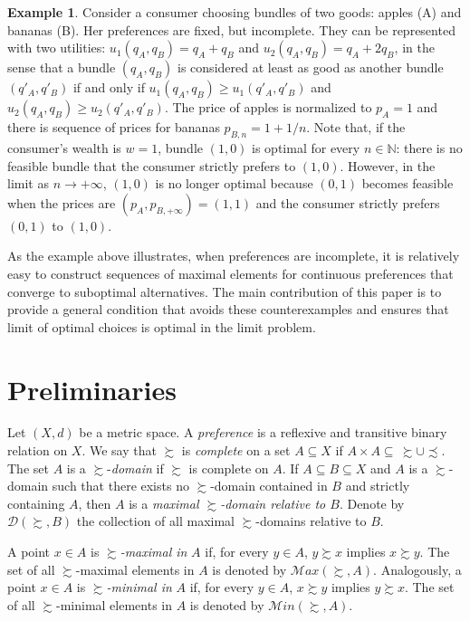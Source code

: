 \documentclass[12pt, oneside]{amsart}
\theoremstyle{definition}
\newtheorem{example}{Example}
\begin{document}
\begin{example}
Consider a consumer choosing bundles of two goods: apples (A) and bananas (B). Her preferences are fixed, but incomplete. They can be represented with two utilities: $u_1(q_A, q_B) = q_A + q_B$ and $u_2(q_A, q_B) = q_A + 2 q_B$, in the sense that a bundle $(q_A, q_B)$ is considered at least as good as another bundle $(q'_A, q'_B)$ if and only if $u_1(q_A,q_B) \geq u_1(q'_A,q'_B)$ and $u_2(q_A,q_B) \geq u_2(q'_A,q'_B)$. The price of apples is normalized to $p_A = 1$ and there is sequence of prices for bananas $p_{B,n} = 1+1/n$. Note that, if the consumer's wealth is $w=1$, bundle $(1,0)$ is optimal for every $n \in \mathbb{N}$: there is no feasible bundle that the consumer strictly prefers to $(1,0)$. However, in the limit as $n\to +\infty$, $(1,0)$ is no longer optimal because $(0,1)$ becomes feasible when the prices are $(p_A, p_{B,+\infty}) = (1,1)$ and the consumer strictly prefers $(0,1)$ to $(1,0)$.
\end{example}

As the example above illustrates, when preferences are incomplete, it is relatively easy to construct sequences of maximal elements for continuous preferences that converge to suboptimal alternatives. The main contribution of this paper is to provide a general condition that avoids these counterexamples and ensures that limit of optimal choices is optimal in the limit problem.




\section{Preliminaries}
Let $(X, d)$ be a metric space. A \textit{preference} is a reflexive and transitive binary relation on $X$. We say  that $\succsim$ is \textit{complete} on a set $A \subseteq X$ if $A \times A \subseteq \hspace{2pt} \succsim \cup \precsim$. The set $A$ is a $\succsim$-\textit{domain} if $\succsim$ is complete on $A$. If $A \subseteq B \subseteq X$ and $A$ is a $\succsim$-domain such that there exists no $\succsim$-domain contained in $B$ and strictly containing $A$, then $A$ is a \textit{maximal $\succsim$-domain relative to $B$}. Denote by $\mathcal{D}\left(\succsim, B\right)$ the collection of all maximal $\succsim$-domains relative to $B$.

A point $x \in A$ is $\succsim$\textit{-maximal in} $A$ if, for every $y \in A$, $y \succsim x$ implies $x \succsim y$. The set of all $\succsim$-maximal elements in $A$ is denoted by $\mathcal{M}ax(\succsim, A)$. Analogously, a point $x \in A$ is $\succsim$\textit{-minimal in} $A$ if, for every $y \in A$, $x \succsim y$ implies $y \succsim x$. The set of all $\succsim$-minimal elements in $A$ is denoted by $\mathcal{M}in(\succsim, A)$.
\end{document}
